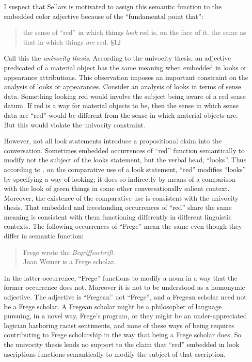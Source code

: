 \documentclass[12pt]{article}
\begin{document}
I suspect that Sellars is motivated to assign this semantic function to the embedded color adjective because of the ``fundamental point that'':
\begin{quote}
    the sense of ``red'' in which things \emph{look} red is, on the face of it, the same as that in which things \emph{are} red. §12
\end{quote} 
Call this the \emph{univocity thesis}. According to the univocity thesis, an adjective predicated of a material object has the same meaning when embedded in looks or appearance attributions. This observation imposes an important constraint on the analysis of looks or appearances. Consider an analysis of looks in terms of sense data. Something looking red would involve the subject being aware of a red sense datum. If red is a way for material objects to be, then the sense in which sense data are ``red'' would be different from the sense in which material objects are. But this would violate the univocity constraint. %

However, not all look statements introduce a propositional claim into the conversation. Sometimes embedded occurrences of ``red'' function semantically to modify not the subject of the looks statement, but the verbal head, ``looks''. Thus according to \citet[]{Chisholm:1957dq}, on the comparative use of a look statement, ``red'' modifies ``looks'' by specifying a way of looking; it does so indirectly by means of a comparison with the look of green things in some other conversationally salient context. Moreover, the existence of the comparative use is consistent with the univocity thesis. That embedded and freestanding occurrences of ``red'' share the same meaning is consistent with them functioning differently in different linguistic contexts. The following occurrences of ``Frege'' mean the same even though they differ in semantic function: 
\begin{quote}
	Frege wrote the \emph{Begriffsschrift}.\\
	Joan Weiner is a Frege scholar. 
\end{quote}
In the latter occurrence, ``Frege'' functions to modify a noun in a way that the former occurrence does not. Moreover it is not to be understood as a homonymic adjective. The adjective is ``Fregean'' not ``Frege'', and a Fregean scholar need not be a Frege scholar. A Fregean scholar might be a philosopher of language pursuing, in a novel way, Frege's program, or they might be an under-appreciated logician harboring racist sentiments, and none of these ways of being requires contributing to Frege scholarship in the way that being a Frege scholar does. So the univocity thesis lends no support to the claim that ``red'' embedded in look ascriptions functions semantically to modify the subject of that ascription.
\end{document}
